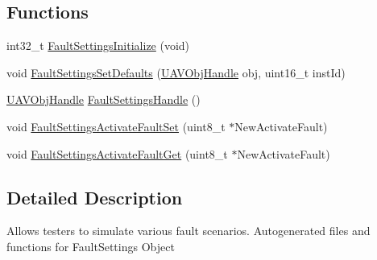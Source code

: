 \subsection*{\-Functions}
\begin{DoxyCompactItemize}
\item 
int32\-\_\-t \hyperlink{group___fault_settings_ga3498dcb06a5e1589a0eeb87bb5154449}{\-Fault\-Settings\-Initialize} (void)
\item 
void \hyperlink{group___fault_settings_ga5e93d11e2345b17bef14eaff51d89884}{\-Fault\-Settings\-Set\-Defaults} (\hyperlink{targets_2_u_a_v_objects_2inc_2uavobjectmanager_8h_a279053e22be53ce9f895043aaeb91e3b}{\-U\-A\-V\-Obj\-Handle} obj, uint16\-\_\-t inst\-Id)
\item 
\hyperlink{targets_2_u_a_v_objects_2inc_2uavobjectmanager_8h_a279053e22be53ce9f895043aaeb91e3b}{\-U\-A\-V\-Obj\-Handle} \hyperlink{group___fault_settings_ga4da19c908ed0464935ce2e5b770327e2}{\-Fault\-Settings\-Handle} ()
\item 
void \hyperlink{group___fault_settings_ga33d9afee4ca9a259d7dd20f2c8a1bb46}{\-Fault\-Settings\-Activate\-Fault\-Set} (uint8\-\_\-t $\ast$\-New\-Activate\-Fault)
\item 
void \hyperlink{group___fault_settings_ga6370b9be3fe273a35d7334e4d6f6a14d}{\-Fault\-Settings\-Activate\-Fault\-Get} (uint8\-\_\-t $\ast$\-New\-Activate\-Fault)
\end{DoxyCompactItemize}


\subsection{\-Detailed \-Description}
\-Allows testers to simulate various fault scenarios. \-Autogenerated files and functions for \-Fault\-Settings \-Object 

